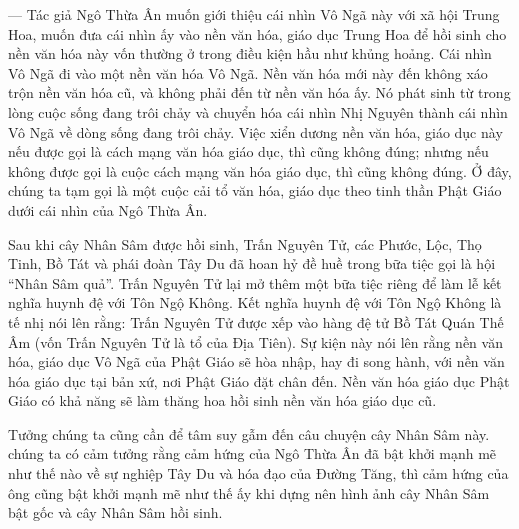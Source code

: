 — Tác giả Ngô Thừa Ân muốn giới thiệu cái nhìn Vô Ngã này với xã hội Trung Hoa, muốn đưa cái nhìn ấy vào nền văn hóa, giáo dục Trung Hoa để hồi sinh cho nền văn hóa này vốn thường ở trong điều kiện hầu như khủng hoảng. Cái nhìn Vô Ngã đi vào một nền văn hóa Vô Ngã. Nền văn hóa mới này đến không xáo trộn nền văn hóa cũ, và không phải đến từ nền văn hóa ấy. Nó phát sinh từ trong lòng cuộc sống đang trôi chảy và chuyển hóa cái nhìn Nhị Nguyên thành cái nhìn Vô Ngã về dòng sống đang trôi chảy. Việc xiển dương nền văn hóa, giáo dục này nếu được gọi là cách mạng văn hóa giáo dục, thì cũng không đúng; nhưng nếu không được gọi là cuộc cách mạng văn hóa giáo dục, thì cũng không đúng. Ở đây, chúng ta tạm gọi là một cuộc cải tổ văn hóa, giáo dục theo tinh thần Phật Giáo dưới cái nhìn của Ngô Thừa Ân.

Sau khi cây Nhân Sâm được hồi sinh, Trấn Nguyên Tử, các Phước, Lộc, Thọ Tinh, Bồ Tát và phái đoàn Tây Du đã hoan hỷ đề huề trong bữa tiệc gọi là hội ``Nhân Sâm quả''. Trấn Nguyên Tử lại mở thêm một bữa tiệc riêng để làm lễ kết nghĩa huynh đệ với Tôn Ngộ Không. Kết nghĩa huynh đệ với Tôn Ngộ Không là tế nhị nói lên rằng: Trấn Nguyên Tử được xếp vào hàng đệ tử Bồ Tát Quán Thế Âm (vốn Trấn Nguyên Tử là tổ của Địa Tiên). Sự kiện này nói lên rằng nền văn hóa, giáo dục Vô Ngã của Phật Giáo sẽ hòa nhập, hay đi song hành, với nền văn hóa giáo dục tại bản xứ, nơi Phật Giáo đặt chân đến. Nền văn hóa giáo dục Phật Giáo có khả năng sẽ làm thăng hoa hồi sinh nền văn hóa giáo dục cũ.

Tưởng chúng ta cũng cần để tâm suy gẫm đến câu chuyện cây Nhân Sâm này. chúng ta có cảm tưởng rằng cảm hứng của Ngô Thừa Ân đã bật khởi mạnh mẽ như thế nào về sự nghiệp Tây Du và hóa đạo của Đường Tăng, thì cảm hứng của ông cũng bật khởi mạnh mẽ như thế ấy khi dựng nên hình ảnh cây Nhân Sâm bật gốc và cây Nhân Sâm hồi sinh.

